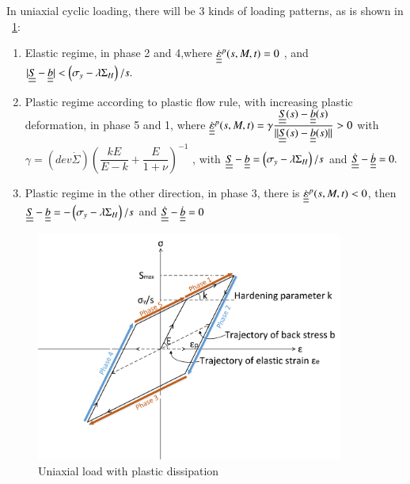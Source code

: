 \documentclass[3p,times,procedia,number]{elsarticle}
\newcommand{\figref}[1]{\figurename~\ref{#1}}
\begin{document}
\noindent
In uniaxial cyclic loading, there will be 3 kinds of loading patterns, as is shown in \figref{backstress}:

\vspace{6pt}
\begin{enumerate}
	
	\item	Elastic regime, in phase 2 and 4,where $\dot{\uline{\uline{\varepsilon}}}^p(s,M,t)=0$ ,  and $|\uline{\uline{S}}-\uline{\uline{b}}|<\left( \sigma_y-\lambda \Sigma_H\right)/s. $ 
	\vspace{6pt}
	
	\item Plastic regime according to plastic flow rule, with increasing plastic deformation, in phase 5 and 1, where	$\dot{\uline{\uline{\varepsilon}}}^p(s,M,t)=\gamma\dfrac{\uline{\uline{S}}(s)-\uline{\uline{b}}(s)}{||\uline{\uline{S}}(s)-\uline{\uline{b}}(s)||}> 0$ with  $\gamma=\left( dev\dot{\Sigma}\right)\left(\dfrac{kE}{E-k}+\dfrac{E}{1+\nu} \right) ^{-1}$ ,  with $\uline{\uline{S}}-\uline{\uline{b}}=\left( \sigma_y-\lambda \Sigma_H\right)/s$ and $\dot{\uline{\uline{S}}}-\dot{\uline{\uline{b}}}=0.$ 
	\vspace{6pt}
	
	\item Plastic regime in the other direction, in phase 3, there is	$\dot{\uline{\uline{\varepsilon}}}^p(s,M,t)<0$,  then $\uline{\uline{S}}-\uline{\uline{b}}=-\left( \sigma_y-\lambda \Sigma_H\right)/s$ and $\dot{\uline{\uline{S}}}-\dot{\uline{\uline{b}}}=0$ 
	
\end{enumerate}	

\begin{figure}[!h]
	\centering
	\includegraphics[width=0.9\textwidth]{figures//backstress.png} 
	\caption{Uniaxial load with plastic dissipation}
	\label{backstress}
\end{figure}
\end{document}
